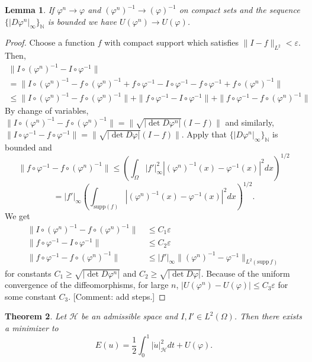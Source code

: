 \documentclass{article}
\theoremstyle{plain}
\newtheorem{teo}{Theorem}[section]
\newtheorem{lem}[teo]{Lemma}
\theoremstyle{definition}
\numberwithin{equation}{section}
\newcommand{\N}{\ensuremath{\mathbb{N}}}
\begin{document}
\begin{lem}
	\label{lem:impliesweak}
	If $\varphi^n\to \varphi$ and $(\varphi^n)^{-1}\to (\varphi)^{-1}$ on compact sets and the sequence $\{|D\varphi^n|_\infty\}_\N$ is bounded we have $U(\varphi^n)\to U(\varphi)$.
\end{lem}
\begin{proof}
	Choose a function $f$ with compact support which satisfies $\|I-f\|_{L^2}<\varepsilon$. Then, 
	\begin{multline*}
	\|I\circ (\varphi^n)^{-1} - I\circ \varphi^{-1}\|\\
	=\|I\circ (\varphi^n)^{-1}- f\circ(\varphi^n)^{-1}+f\circ \varphi^{-1}- I\circ \varphi^{-1} -f\circ \varphi^{-1}+f\circ(\varphi^n)^{-1}\|\\
	\leq \|I\circ (\varphi^n)^{-1}- f\circ(\varphi^n)^{-1}\|+\|f\circ \varphi^{-1}- I\circ \varphi^{-1}\|+\|f\circ \varphi^{-1}-f\circ(\varphi^n)^{-1}\|
	\end{multline*}
	By change of variables, $\|I\circ (\varphi^n)^{-1}- f\circ(\varphi^n)^{-1}\|=\|\sqrt{|\det D\varphi^n|}(I-f)\|$ and similarly, $\|I\circ \varphi^{-1}-f\circ\varphi^{-1}\|=\|\sqrt{|\det D\varphi|}(I-f)\|$. Apply that $\{|D\varphi^n|_\infty\}_\N$ is bounded and
	\[
	\|f\circ \varphi^{-1}-f\circ(\varphi^n)^{-1}\|\leq \left(\int_\Omega |f'|^2_\infty|(\varphi^n)^{-1}(x)-\varphi^{-1}(x)|^2dx\right)^{1/2}
	\]
	\[
	=|f'|_\infty\left(\int_{\mathrm{supp}(f)} |(\varphi^n)^{-1}(x)-\varphi^{-1}(x)|^2dx\right)^{1/2}.
	\]
	We get
	\begin{align*}
	\|I\circ (\varphi^n)^{-1}- f\circ(\varphi^n)^{-1}\|&\ \leq C_1 \varepsilon \\
	\|f\circ \varphi^{-1}- I\circ \varphi^{-1}\| &\ \leq C_2 \varepsilon \\
	\|f\circ \varphi^{-1}-f\circ(\varphi^n)^{-1}\|&\ \leq |f'|_\infty\|(\varphi^n)^{-1}-\varphi^{-1}\|_{L^2(\mathrm{supp}\,f)} 
	\end{align*}
	for constants $C_1\geq \sqrt{|\det D\varphi^n|}$ and $C_2\geq \sqrt{|\det D\varphi|}$. Because of the uniform convergence of the diffeomorphisms, for large $n$, $|U(\varphi^n)-U(\varphi)|\leq C_3\varepsilon$ for some constant $C_3$. [Comment: add steps.]
\end{proof}


\begin{teo}
	Let $\mathcal H$ be an admissible space  and $I,I'\in L^2(\Omega)$. Then there exists a minimizer to
	\[
	E(u)=\frac{1}{2}\int_0^1 |\dot{u}|_{\mathcal H}^2 dt + U(\varphi).
	\]
\end{teo}
\end{document}
